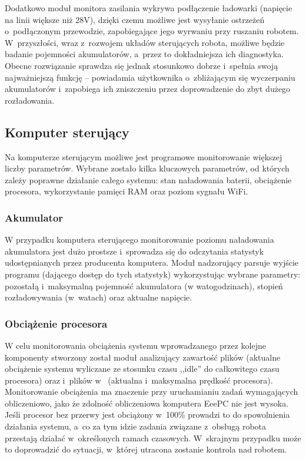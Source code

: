Dodatkowo moduł monitora zasilania wykrywa podłączenie ładowarki (napięcie na
linii większe niż 28V), dzięki czemu możliwe jest wysyłanie ostrzeżeń 
o~podłączonym przewodzie, zapobiegające jego wyrwaniu przy ruszaniu robotem. 
W~przyszłości, wraz z~rozwojem układów sterujących robota, możliwe będzie badanie
pojemności akumulatorów, a~przez to dokładniejsza ich diagnostyka. Obecne
rozwiązanie sprawdza się jednak stosunkowo dobrze i~spełnia swoją najważniejszą
funkcję -- powiadamia użytkownika o~zbliżającym się wyczerpaniu akumulatorów 
i~zapobiega ich zniszczeniu przez doprowadzenie do zbyt dużego rozładowania.

\subsection{Komputer sterujący}

Na komputerze sterującym możliwe jest programowe monitorowanie większej liczby
parametrów. Wybrane zostało kilka kluczowych parametrów, od których zależy
poprawne działanie całego systemu: stan naładowania baterii, obciążenie
procesora, wykorzystanie pamięci RAM oraz poziom sygnału WiFi.

\subsubsection{Akumulator}

W przypadku komputera sterującego monitorowanie poziomu naładowania akumulatora
jest dużo prostsze i~sprowadza się do odczytania statystyk udostępnianych przez
producenta komputera. Moduł nadzorujący parsuje wyjście programu 
(dającego dostęp do tych statystyk) wykorzystując wybrane parametry: pozostałą 
i~maksymalną pojemność akumulatora (w watogodzinach), stopień rozładowywania 
(w~watach) oraz aktualne napięcie.

\subsubsection{Obciążenie procesora}

W celu monitorowania obciążenia systemu wprowadzanego przez kolejne komponenty
stworzony został moduł analizujący zawartość plików  (aktualne
obciążenie systemu wyliczane ze stosunku czasu ,,idle'' do całkowitego czasu
procesora) oraz  i~plików w~
(aktualna i~maksymalna prędkość procesora). Monitorowanie obciążenia ma
znaczenie przy uruchamianiu zadań wymagających obliczeniowo, jako że zdolność
obliczeniowa komputera EeePC nie jest wysoka. Jeśli procesor bez przerwy jest
obciążony w~100\% prowadzi to do spowolnienia działania systemu, a~co za tym
idzie zadania związane z~obsługą robota przestają działać w~określonych ramach
czasowych. W~skrajnym przypadku może to doprowadzić do sytuacji, w~której
utracona zostanie kontrola nad robotem.

